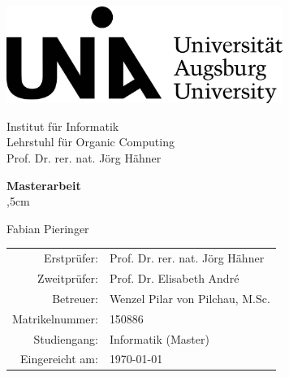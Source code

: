 \begin{titlepage}
\begin{large}
\begin{center}
\includegraphics[width=9cm]{uni-augsburg-logo.jpg}

Institut f\"ur Informatik\\
Lehrstuhl f\"ur Organic Computing\\
Prof. Dr. rer. nat. J\"org H\"ahner\\
\vskip 2cm



\textbf{\Large Masterarbeit}\\
,5cm
{\LARGE\bfseries\textsf \titel \par}
\vfill

{\huge Fabian Pieringer}\\
\vfill


\end{center}
\vfill
\newpage
\thispagestyle{empty}
\begin{tabular}{rl}
Erstpr\"ufer: & Prof. Dr. rer. nat. J\"org H\"ahner\\
Zweitpr\"ufer: & Prof. Dr. Elisabeth André\\
Betreuer: & Wenzel Pilar von Pilchau, M.Sc.\\
Matrikelnummer: & 150886\\
Studiengang: & Informatik (Master)\\
Eingereicht am: & \today\\
\end{tabular}
\end{large}
\end{titlepage}